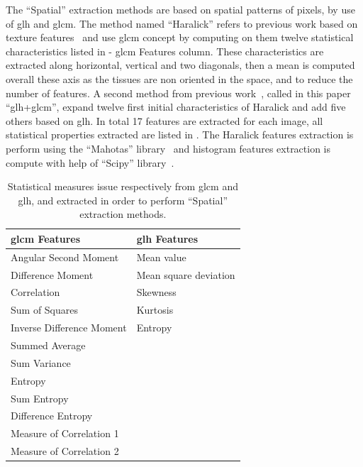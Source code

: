\documentclass[journal,article,submit,moreauthors,pdftex, applsci]{Definitions/mdpi}
\begin{document}
The “Spatial” extraction methods are based on spatial patterns of pixels, by use of \ac{glh} and \ac{glcm}. The method named “Haralick” refers to previous work based on texture features~\cite{Haralick1973} and use \ac{glcm} concept by computing on them twelve statistical characteristics listed in  - \ac{glcm} Features column. These characteristics are extracted along horizontal, vertical and two diagonals, then a mean is computed overall these axis as the tissues are non oriented in the space, and to reduce the number of features. A second method from previous work~\cite{Wiltgen2008}, called in this paper “\ac{glh}+\ac{glcm}”, expand twelve first initial characteristics of Haralick and add five others based on \ac{glh}. In total 17 features are extracted for each image, all statistical properties extracted are listed in . The Haralick features extraction is perform using the “Mahotas” library~\cite{coelho2012mahotas} and histogram features extraction is compute with help of “Scipy” library~\cite{Jones2001}.\par
\begin{table}[h]
    \centering
    \begin{tabular}{ll}
        \hline
        \textbf{\ac{glcm} Features}& \textbf{\ac{glh} Features}     \\ \hline
        Angular Second Moment      & Mean value                     \\
        Difference Moment          & Mean square deviation          \\
        Correlation                & Skewness                       \\
        Sum of Squares             & Kurtosis                       \\
        Inverse Difference Moment  & Entropy                        \\     
        Summed Average             &                                \\    
        Sum Variance               &                                \\    
        Entropy                    &                                \\    
        Sum Entropy                &                                \\    
        Difference Entropy         &                                \\    
        Measure of Correlation 1   &                                \\  
        Measure of Correlation 2   &                                \\ 
    \end{tabular}
    \caption{Statistical measures issue respectively from \ac{glcm} and \ac{glh}, and extracted in order to perform “Spatial” extraction methods.}
    \label{tab:histogram_features}
\end{table}\par
\end{document}
